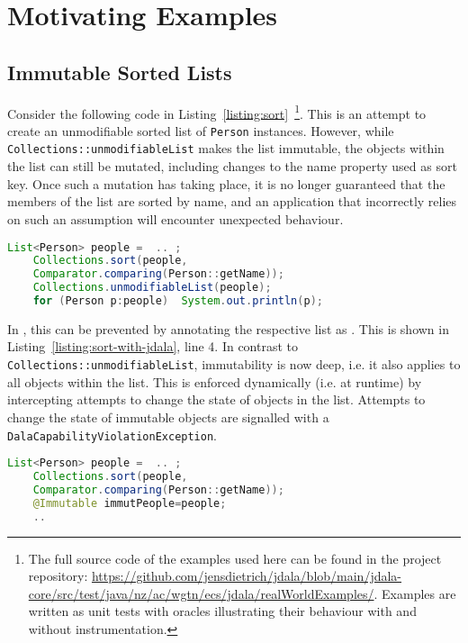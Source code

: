 \section{Motivating Examples}

\subsection{Immutable Sorted Lists}	


Consider the following code in Listing~\ref{listing:sort}~\footnote{The full source code of the examples used here can be found in the project repository: \url{https://github.com/jensdietrich/jdala/blob/main/jdala-core/src/test/java/nz/ac/wgtn/ecs/jdala/realWorldExamples/}. Examples are written as unit tests with oracles illustrating their behaviour with and without \jdala instrumentation.}. This is an attempt to create an unmodifiable sorted list of \texttt{Person} instances. 
However, while \texttt{Collections::unmodifiableList} makes the list immutable, the objects within the list can still be mutated, including changes to the name property used as sort key.  Once such a mutation 
has taking place, it is no longer guaranteed that the members of the list are sorted by name, and an application that incorrectly relies on such an assumption will encounter unexpected behaviour.

\begin{lstlisting}[language=Java, caption=Erroneous Attempt to Make a Sorted List Immutable, label=listing:sort]
	List<Person> people =  .. ;
	Collections.sort(people,
	Comparator.comparing(Person::getName));
	Collections.unmodifiableList(people);
	for (Person p:people)  System.out.println(p);
\end{lstlisting}



In \jdala ,  this can be prevented by annotating the respective list as \Immutable. This is shown in Listing~\ref{listing:sort-with-jdala}, line 4. In contrast to \texttt{Collections::unmodifiableList}, immutability is now deep, i.e. it also applies to all objects within the list. This is enforced dynamically (i.e. at runtime) by intercepting attempts to change the state of objects in the list.  Attempts to change the state of immutable objects are signalled with a \texttt{DalaCapabilityViolationException}. 

\begin{lstlisting}[language=Java, caption=Make a Sorted List Immutable with \jdala, label=listing:sort-with-jdala]
	List<Person> people =  .. ;
	Collections.sort(people,
	Comparator.comparing(Person::getName));
	@Immutable immutPeople=people;
	..
\end{lstlisting}


